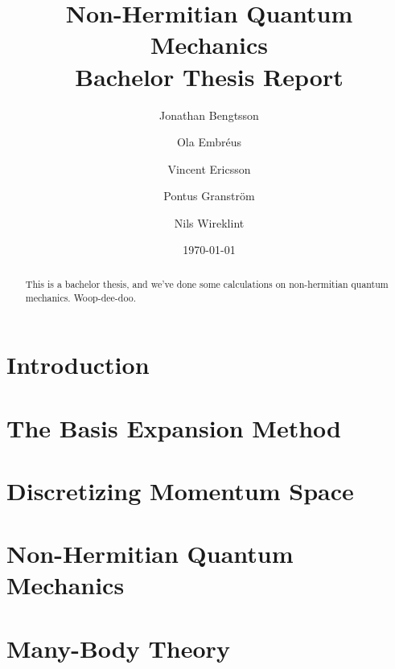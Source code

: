 \documentclass[12pt,a4paper]{report}
\begin{document}
  

\title{Non-Hermitian Quantum Mechanics\\
\Large Bachelor Thesis Report}
\author{Jonathan Bengtsson  \and Ola Embréus \and Vincent Ericsson \and Pontus Granström \and Nils Wireklint}
\date{\today}



\maketitle

\newpage
\begin{abstract}
This is a bachelor thesis, and we've done some calculations on non-hermitian quantum mechanics. Woop-dee-doo.
\end{abstract}
\newpage

\tableofcontents


\newpage

\setcounter{page}{1}

\chapter{Introduction}
\label{cha:introduction}



\chapter{The Basis Expansion Method}
\label{cha:basis_expansion}



\chapter{Discretizing Momentum Space}
\label{cha:mom_space}


\chapter{Non-Hermitian Quantum Mechanics} 
\label{cha:nhqm}



\chapter{Many-Body Theory}
\label{cha:many_body}


\end{document}
